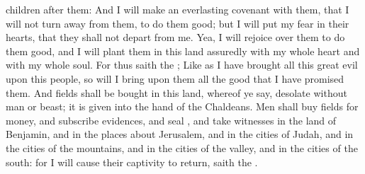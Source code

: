 {children
after them:
And I will
make an
everlasting
covenant with them, that I will not turn
away from
them, to do them
good; but I will
put my
fear in their
hearts, that they shall not
depart from me.
Yea, I will
rejoice over them to do them
good, and I will
plant them in this
land
assuredly with my whole
heart and with my whole
soul.
For thus
saith the
{}; Like as I have
brought all this
great
evil upon this
people, so will I
bring upon them all the
good that I have
promised them.
And
fields shall be
bought in this
land, whereof ye
say,
{}
desolate without
man or
beast; it is
given into the
hand of the
Chaldeans.
Men shall
buy
fields for
money, and
subscribe
evidences, and
seal
{}, and
take
witnesses in the
land of
Benjamin, and in the places
about
Jerusalem, and in the
cities of
Judah, and in the
cities of the
mountains, and in the
cities of the
valley, and in the
cities of the
south: for I will cause their
captivity to
return,
saith the
{}.

}
